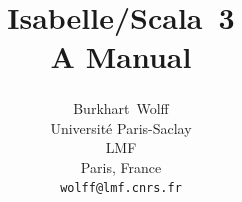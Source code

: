 \documentclass[abstract=on,fontsize=10pt,a4paper,mpinclude=true,
oneside,
pagesize,DIV=14]{scrartcl}
\title{Isabelle/Scala~3\\[.3em]\large A Manual}
\author{
Burkhart~Wolff\textsuperscript{\orcidlink{0000-0002-9648-7663}}\\\small
Universit\'e Paris-Saclay\\
LMF\\
Paris, France\\
\texttt{wolff@lmf.cnrs.fr}
}
\date{}
\begin{document}
\renewcommand{\sectionautorefname}{Section}
\renewcommand{\subsectionautorefname}{Section}
\renewcommand{\subsubsectionautorefname}{Section}

\maketitle



\printbibliography
\end{document}
